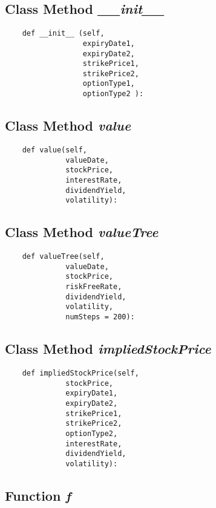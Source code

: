 \documentclass[twoside,11pt]{book}
\begin{document}
\subsection{Class Method {\it \_\_init\_\_ }}


\begin{lstlisting}
    def __init__ (self,
                  expiryDate1,
                  expiryDate2,
                  strikePrice1,
                  strikePrice2,
                  optionType1,
                  optionType2 ):
\end{lstlisting}

\subsection{Class Method {\it value}}


\begin{lstlisting}
    def value(self,
              valueDate,
              stockPrice,
              interestRate,
              dividendYield,
              volatility):
\end{lstlisting}

\subsection{Class Method {\it valueTree}}


\begin{lstlisting}
    def valueTree(self,
              valueDate,
              stockPrice,
              riskFreeRate,
              dividendYield,
              volatility,
              numSteps = 200):
\end{lstlisting}

\subsection{Class Method {\it impliedStockPrice}}


\begin{lstlisting}
    def impliedStockPrice(self,
              stockPrice,
              expiryDate1,
              expiryDate2,
              strikePrice1, 
              strikePrice2, 
              optionType2,
              interestRate, 
              dividendYield, 
              volatility):
\end{lstlisting}

\subsection{Function {\it f}}
\end{document}
